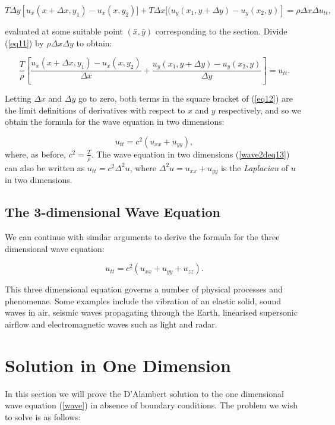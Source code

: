 \documentclass[12pt]{article}
\numberwithin{equation}{section}
\begin{document}
\begin{equation} \label{eq11}
    T\Delta y\left[u_x(x+\Delta x, y_1)-u_x(x, y_2)]+T\Delta x[(u_y(x_1, y+\Delta y)-u_y(x_2,y)\right]=\rho\Delta x\Delta u_{tt},
\end{equation}

evaluated at some suitable point $(\bar{x},\bar{y})$ corresponding to the section. Divide (\ref{eq11}) by $\rho\Delta x\Delta y$ to obtain:

\begin{equation} \label{eq12}
    \frac{T}{\rho}\left[\frac{u_x(x+\Delta x, y_1)-u_x(x,y_2)}{\Delta x}+\frac{u_y(x_1,y+ \Delta y)-u_y(x_2,y)}{\Delta y}\right]=u_{tt}.
\end{equation}

Letting $\Delta x$ and $\Delta y$ go to zero, both terms in the square bracket of (\ref{eq12}) are the limit definitions of derivatives with
respect to $x$ and $y$ respectively, and so we obtain the formula for the wave equation in two dimensions:

\begin{equation} \label{wave2deq13}
    u_{tt}=c^2(u_{xx}+u_{yy}),
\end{equation}
where, as before, $c^2=\frac{T}{\rho}$. The wave equation in two dimensions (\ref{wave2deq13}) can also be written as $u_{tt}=c^2\Delta^2 u$, 
where $\Delta^2 u=u_{xx}+u_{yy}$ is the \emph{Laplacian} of $u$ in two dimensions.

\subsection{The 3-dimensional Wave Equation}
We can continue with similar arguments to derive the formula for the three dimensional wave equation:

\begin {equation} \label{wave3deq14}
    u_{tt}=c^2(u_{xx}+u_{yy}+u_{zz}).
\end{equation}

This three dimensional equation governs a number of physical processes and phenomenae. Some examples include the vibration of an elastic solid, 
sound waves in air, seismic waves propagating through the Earth, linearised supersonic airflow and electromagnetic waves such as light and radar.
\cite{Str}

\section{Solution in One Dimension}
In this section we will prove the D'Alambert solution to the one dimensional wave equation (\ref{wave}) 
in absence of boundary conditions. The problem we wish to solve is as follows:
\end{document}
